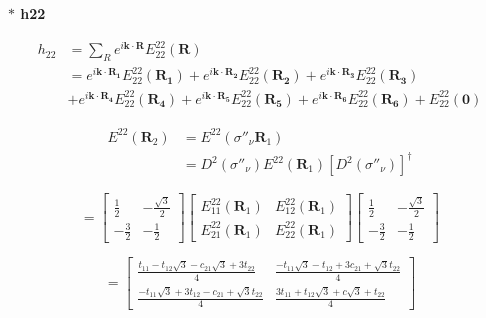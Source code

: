 \documentclass{article}
\begin{document}
\textbf{ $\ast$ h22}

\begin{align}
    h_{22} & = \sum_{R}^{} e^{i\mathbf{k\cdot R}} E^{22}_{22}(\textbf{R}) \nonumber                                                                                                                                \\
           & =  e^{i\mathbf{k\cdot R_1}} E^{22}_{22}(\mathbf{R_1}) +  e^{i\mathbf{k\cdot R_2}} E^{22}_{22}(\mathbf{R_2}) +  e^{i\mathbf{k\cdot R_3}} E^{22}_{22}(\mathbf{R_3}) \nonumber                           \\
           & +  e^{i\mathbf{k\cdot R_4}} E^{22}_{22}(\mathbf{R_4}) +  e^{i\mathbf{k\cdot R_5}} E^{22}_{22}(\mathbf{R_5}) +  e^{i\mathbf{k\cdot R_6}} E^{22}_{22}(\mathbf{R_6}) + E^{22}_{22}(\mathbf{0}) \nonumber
\end{align}

\begin{align}
    E^{22} (\mathbf{R}_2)
     & =  E^{22} (\sigma''_\nu \mathbf{R}_1) \nonumber                                              \\
     & = D^2(\sigma''_\nu)  E^{22}(\mathbf{R}_1) \left[ D^2(\sigma''_\nu) \right]^\dagger \nonumber
\end{align}

\[
    \renewcommand{\arraystretch}{0.75}
    =
    \begin{bmatrix}
        \frac{1}{2}  & -\frac{\sqrt{3}}{2} \\
        -\frac{3}{2} & -\frac{1}{2}
    \end{bmatrix}
    \begin{bmatrix}
        E_{11}^{22}(\mathbf{R}_1) & E_{12}^{22}(\mathbf{R}_1) \\
        E_{21}^{22}(\mathbf{R}_1) & E_{22}^{22}(\mathbf{R}_1)
    \end{bmatrix}
    \begin{bmatrix}
        \frac{1}{2}  & -\frac{\sqrt{3}}{2} \\
        -\frac{3}{2} & -\frac{1}{2}
    \end{bmatrix}
\]

\[
    \renewcommand{\arraystretch}{0.75}
    =
    \begin{bmatrix}
        \frac{t_{11} - t_{12}\sqrt{3} -c_{21}\sqrt{3} + 3t_{22}}{4}   & \frac{-t_{11}\sqrt{3} - t_{12} + 3c_{21} + \sqrt{3}t_{22}}{4} \\
        \frac{-t_{11}\sqrt{3} + 3t_{12} - c_{21} + \sqrt{3}t_{22}}{4} & \frac{3t_{11} + t_{12}\sqrt{3} + c\sqrt{3} + t_{22}}{4}
    \end{bmatrix}
\]
\end{document}
